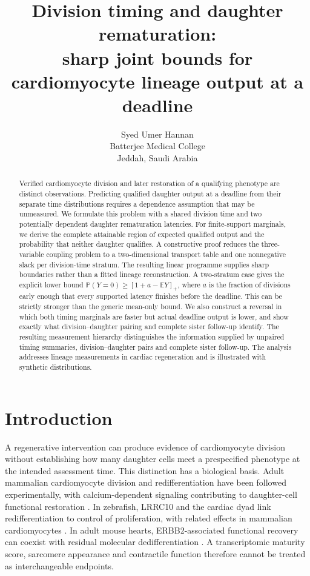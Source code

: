 \documentclass[11pt]{article}
\title{Division timing and daughter rematuration:\\sharp joint bounds for cardiomyocyte lineage output at a deadline}
\author{Syed Umer Hannan\\[3pt]\small Batterjee Medical College\\\small Jeddah, Saudi Arabia}\date{}
\newcommand{\E}{\mathbb E}\newcommand{\Prb}{\mathbb P}\newcommand{\pos}[1]{\left[#1\right]_+}
\begin{document}
\maketitle
\begin{abstract}
Verified cardiomyocyte division and later restoration of a qualifying phenotype are distinct observations. Predicting qualified daughter output at a deadline from their separate time distributions requires a dependence assumption that may be unmeasured. We formulate this problem with a shared division time and two potentially dependent daughter rematuration latencies. For finite-support marginals, we derive the complete attainable region of expected qualified output and the probability that neither daughter qualifies. A constructive proof reduces the three-variable coupling problem to a two-dimensional transport table and one nonnegative slack per division-time stratum. The resulting linear programme supplies sharp boundaries rather than a fitted lineage reconstruction. A two-stratum case gives the explicit lower bound $\Prb(Y=0)\geq[1+a-\E Y]_+$, where $a$ is the fraction of divisions early enough that every supported latency finishes before the deadline. This can be strictly stronger than the generic mean-only bound. We also construct a reversal in which both timing marginals are faster but actual deadline output is lower, and show exactly what division--daughter pairing and complete sister follow-up identify. The resulting measurement hierarchy distinguishes the information supplied by unpaired timing summaries, division--daughter pairs and complete sister follow-up. The analysis addresses lineage measurements in cardiac regeneration and is illustrated with synthetic distributions.
\end{abstract}

\section{Introduction}
A regenerative intervention can produce evidence of cardiomyocyte division without establishing how many daughter cells meet a prespecified phenotype at the intended assessment time. This distinction has a biological basis. Adult mammalian cardiomyocyte division and redifferentiation have been followed experimentally, with calcium-dependent signaling contributing to daughter-cell functional restoration \cite{wang}. In zebrafish, LRRC10 and the cardiac dyad link redifferentiation to control of proliferation, with related effects in mammalian cardiomyocytes \cite{nguyen}. In adult mouse hearts, ERBB2-associated functional recovery can coexist with residual molecular dedifferentiation \cite{shakked}. A transcriptomic maturity score, sarcomere appearance and contractile function therefore cannot be treated as interchangeable endpoints.
\end{document}
